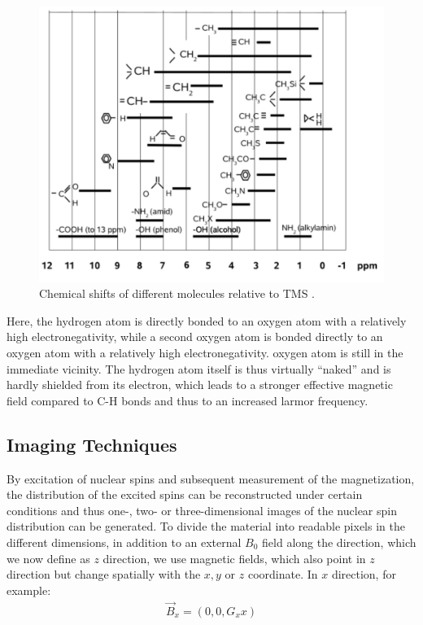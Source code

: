 \begin{figure}[ht]
\centering
\includegraphics[scale=.175]{images//shift.png}
\caption{Chemical shifts of different molecules relative to TMS \cite{script_nmr}.}
\label{fig:shift}
\end{figure}
Here, the hydrogen atom is directly bonded to an oxygen atom with a relatively high electronegativity, while a second oxygen atom is bonded directly to an oxygen atom with a relatively high electronegativity.
oxygen atom is still in the immediate vicinity.
The hydrogen atom itself is thus virtually \enquote{naked} and is hardly shielded from its electron, which leads to a stronger effective magnetic field compared to C-H bonds and thus to an increased larmor frequency. 



\subsection{Imaging Techniques}
By excitation of nuclear spins and subsequent measurement of the magnetization, the distribution of the excited spins can be reconstructed under certain conditions and thus one-, two- or three-dimensional images of the nuclear spin distribution can be generated.
To divide the material into readable pixels in the different dimensions, in addition to an external $B_0$ field along the direction, which we now define as $z$ direction, we use magnetic fields, which also point in $z$ direction but change spatially with the $x, y$ or $z$ coordinate.
In $x$ direction, for example:
\begin{align*}
\vec{B}_x=(0,0,G_xx)
\end{align*}

